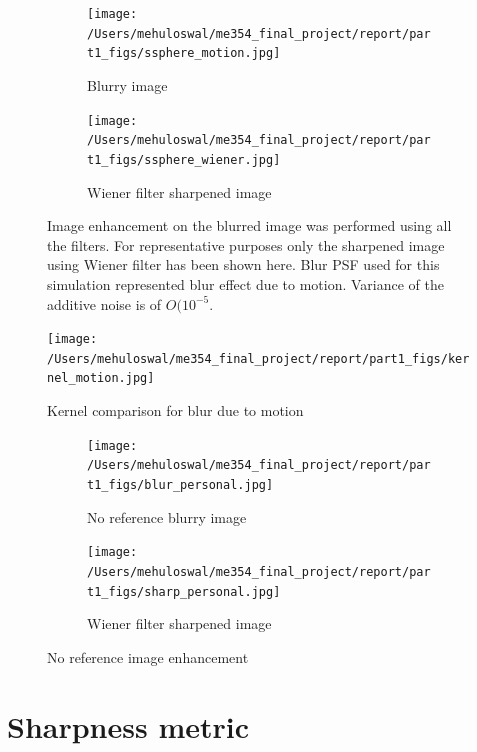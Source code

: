 \documentclass{report}
\begin{document}
\begin{figure}
        \centering
        \begin{subfigure}[b]{0.4\textwidth}
                \centering
                \texttt{[image: /Users/mehuloswal/me354\_final\_project/report/part1\_figs/ssphere\_motion.jpg]}
                \caption{Blurry image}
                
        \end{subfigure}
        \begin{subfigure}[b]{0.4\textwidth}
                \centering
                \texttt{[image: /Users/mehuloswal/me354\_final\_project/report/part1\_figs/ssphere\_wiener.jpg]}
                \caption{Wiener filter sharpened image} 
        \end{subfigure}
\caption{Image enhancement on the blurred image was performed using all the filters. For representative purposes only the sharpened image using Wiener filter has been shown here. Blur PSF used for this simulation represented blur effect due to motion. Variance of the additive noise is of $O(10^{-5}$. }
\end{figure}

\begin{figure}[h!]
  \centering
                \centering
                \texttt{[image: /Users/mehuloswal/me354\_final\_project/report/part1\_figs/kernel\_motion.jpg]}
                \caption{Kernel comparison for blur due to motion}
                \end{figure}

\begin{figure}
        \centering
        \begin{subfigure}[b]{0.4\textwidth}
                \centering
                \texttt{[image: /Users/mehuloswal/me354\_final\_project/report/part1\_figs/blur\_personal.jpg]}
                \caption{No reference blurry image}
                
        \end{subfigure}
        \begin{subfigure}[b]{0.4\textwidth}
                \centering
                \texttt{[image: /Users/mehuloswal/me354\_final\_project/report/part1\_figs/sharp\_personal.jpg]}
                \caption{Wiener filter sharpened image} 
        \end{subfigure}
\caption{No reference image enhancement}
\end{figure}


\chapter{Sharpness metric}
\end{document}
